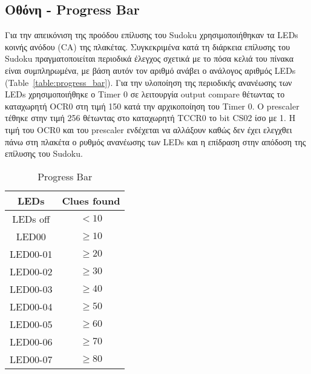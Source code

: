 \documentclass[a4paper,12pt]{article}
\begin{document}
\subsection{Οθόνη - Progress Bar}
Για την απεικόνιση της προόδου επίλυσης του Sudoku χρησιμοποιήθηκαν τα LEDs κοινής ανόδου (CA) της πλακέτας. Συγκεκριμένα κατά τη διάρκεια επίλυσης του Sudoku πραγματοποιείται περιοδικά έλεγχος σχετικά με το πόσα κελιά του πίνακα είναι συμπληρωμένα, με βάση αυτόν τον αριθμό ανάβει ο ανάλογος αριθμός LEDs (Table~\ref{table:progress_bar}).
Για την υλοποίηση της περιοδικής ανανέωσης των LEDs χρησιμοποιήθηκε ο Timer 0 σε λειτουργία output compare θέτωντας το καταχωρητή OCR0 στη τιμή 150 κατά την αρχικοποίηση του Timer 0. Ο prescaler τέθηκε στην τιμή 256 θέτωντας στο καταχωρητή TCCR0 το bit CS02 ίσο με 1. Η τιμή του OCR0 και του prescaler ενδέχεται να αλλάξουν καθώς δεν έχει ελεγχθει πάνω στη πλακέτα ο ρυθμός ανανέωσης των LEDs και η επίδραση στην απόδοση της επίλυσης του Sudoku.

\begin{table}[h!]
\centering
\begin{tabular}[c]{| c | c |}
\hline
LEDs & Clues found \\
\hline
LEDs off & $< 10$ \\
\hline
LED00 &  $\geq 10$ \\
\hline
LED00-01 & $\geq 20$ \\
\hline
LED00-02 & $\geq 30$ \\
\hline
LED00-03 & $\geq 40$ \\
\hline
LED00-04 & $\geq 50$ \\
\hline
LED00-05 & $\geq 60$ \\
\hline
LED00-06 & $\geq 70$ \\
\hline
LED00-07 & $\geq 80$ \\
\hline
\end{tabular}
\caption{Progress Bar}
\label{table:progressBar}
\end{table}





\end{document}
